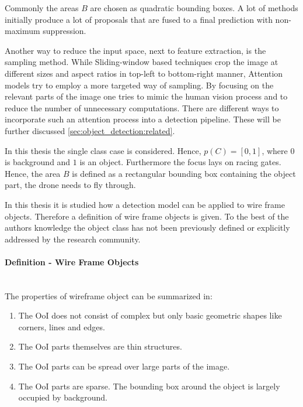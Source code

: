 	Commonly the areas $B$ are chosen as quadratic bounding boxes. A lot of methods initially produce a lot of proposals that are fused to a final prediction with non-maximum suppression.

	Another way to reduce the input space, next to feature extraction, is the sampling method. While Sliding-window based techniques crop the image at different sizes and aspect ratios in top-left to bottom-right manner, Attention models try to employ a more targeted way of sampling. By focusing on the relevant parts of the image one tries to mimic the human vision process and to reduce the number of unnecessary computations. There are different ways to incorporate such an attention process into a detection pipeline. These will be further discussed \autoref{sec:object_detection:related}.

	In this thesis the single class case is considered. Hence, $p(C) = [0,1]$, where $0$ is background and $1$ is an object. Furthermore the focus lays on racing gates. Hence, the area $B$ is defined as a rectangular bounding box containing the object part, the drone needs to fly through. 

	In this thesis it is studied how a detection model can be applied to wire frame objects. Therefore a definition of wire frame objects is given. To the best of the authors knowledge the object class has not been previously defined or explicitly addressed by the research community.

	\paragraph{Definition - Wire Frame Objects}	\hfill \\
	The properties of wireframe object can be summarized in:
		\begin{enumerate}
		\item The \ac{OoI} does not consist of complex but only basic geometric shapes like corners, lines and edges.
		\item The \ac{OoI} parts themselves are thin structures.
		\item The \ac{OoI} parts can be spread over large parts of the image.
		\item The \ac{OoI} parts are sparse. The bounding box around the object is largely occupied by background.
	\end{enumerate}
	
